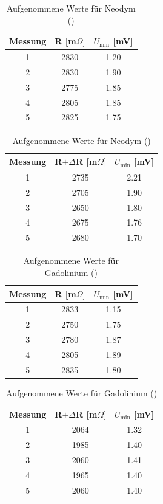 \begin{table}[htbp]
\begin{tabular}{|c|c|c|}
Messung	& R [m$\Omega]$	&$U_\text{min}$ [mV]\\ \hline
1&	2830&	1.20\\ \hline
2&	2830&	1.90\\ \hline
3&	2775&	1.85\\ \hline
4&	2805&	1.85\\ \hline
5&	2825&	1.75\\ \hline
\end{tabular}
\begin{tabular}{|c|c|c|}
Messung	& R$+\Delta$R [m$\Omega]$&$U_\text{min}$ [mV] \\ \hline
1&	2735&	2.21\\ \hline
2&	2705&	1.90\\ \hline
3&	2650&	1.80\\ \hline
4&	2675&	1.76\\ \hline
5&	2680&	1.70\\ \hline
\end{tabular}
\caption{Aufgenommene Werte für Neodym ()}
\label{t_werte}
\end{table}

\begin{table}[htbp]
\begin{tabular}{|c|c|c|}
Messung	& R [m$\Omega]$	&$U_\text{min}$ [mV]\\ \hline
1&	2833&	1.15\\ \hline
2&	2750&	1.75\\ \hline
3&	2780&	1.87\\ \hline
4&	2805&	1.89\\ \hline
5&	2835&	1.80\\ \hline
\end{tabular}
\begin{tabular}{|c|c|c|}
Messung	& R$+\Delta$R [m$\Omega]$&$U_\text{min}$ [mV] \\ \hline
1&	2064&	1.32\\ \hline
2&	1985&	1.40\\ \hline
3&	2060&	1.41\\ \hline
4&	1965&	1.40\\ \hline
5&	2060&	1.40\\ \hline
\end{tabular}
\caption{Aufgenommene Werte für Gadolinium ()}
\label{t_werte}
\end{table}

